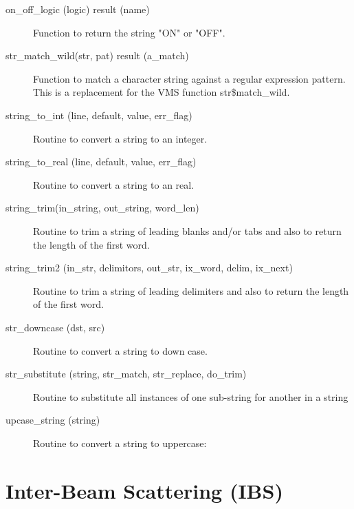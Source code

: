\begin{description}
\label{r:on.off.logic}
\item[on_off_logic (logic) result (name)] \Newline 
Function to return the string "ON" or "OFF".

\label{r:str.match.wild}
\item[str_match_wild(str, pat) result (a_match)] \Newline 
Function to match a character string against a regular expression pattern.
This is a replacement for the VMS function str\$match_wild.

\label{r:string.to.int}
\item[string_to_int (line, default, value, err_flag)] \Newline 
Routine to convert a string to an integer.


\label{r:string.to.real}
\item[string_to_real (line, default, value, err_flag)] \Newline 
Routine to convert a string to an real.

\label{r:string.trim}
\item[string_trim(in_string, out_string, word_len)] \Newline 
Routine to trim a string of leading blanks and/or tabs and also to return the
length of the first word.

\label{r:string.trim2}
\item[string_trim2 (in_str, delimitors, out_str, ix_word, delim, ix_next)] \Newline 
Routine to trim a string of leading delimiters and also to return the
length of the first word.

\label{r:str.downcase}
\item[str_downcase (dst, src)] \Newline 
Routine to convert a string to down case.

\label{r:str.substitute}
\item[str_substitute (string, str_match, str_replace, do_trim)] \Newline 
Routine to substitute all instances of one sub-string for another in a string

\label{r:upcase.string}
\item[upcase_string (string)] \Newline 
Routine to convert a string to uppercase:

\end{description}

\section{Inter-Beam Scattering (IBS)}
\label{r:ibs}

